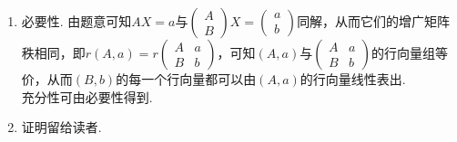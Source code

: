 \begin{enumerate}
\begin{enumerate}
            \item
                必要性. 由题意可知$AX=a$与$\begin{pmatrix}
                    A \\
                    B
                \end{pmatrix}X=\begin{pmatrix}
                    a \\
                    b
                \end{pmatrix}$同解，从而它们的增广矩阵秩相同，即$r(A,a)=r\begin{pmatrix}
                    A & a \\
                    B & b
                \end{pmatrix}$，可知$(A,a)$与$\begin{pmatrix}
                    A & a \\
                    B & b
                \end{pmatrix}$的行向量组等价，从而$(B,b)$的每一个行向量都可以由$(A,a)$的行向量线性表出.\\
                充分性可由必要性得到.
            \item 证明留给读者.
        \end{enumerate}
\end{enumerate}

\clearpage

